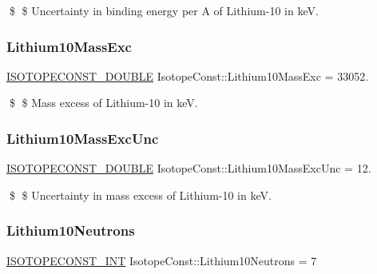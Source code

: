 \$ \$ Uncertainty in binding energy per A of Lithium-\/10 in keV. \mbox{\label{group___isotope_const-_lithium-_li10_ga315401416c2338757900bbe60432f1ac}} 
\subsubsection{\texorpdfstring{Lithium10\+Mass\+Exc}{Lithium10MassExc}}
{\footnotesize\ttfamily \mbox{\hyperlink{group___isotope_const-_macros_ga8f45a7272ce02c0b4c65c44636ed719a}{I\+S\+O\+T\+O\+P\+E\+C\+O\+N\+S\+T\+\_\+\+D\+O\+U\+B\+LE}} Isotope\+Const\+::\+Lithium10\+Mass\+Exc = 33052.}

\$ \$ Mass excess of Lithium-\/10 in keV. \mbox{\label{group___isotope_const-_lithium-_li10_ga5f5e889a13e7f0de11b2d868118b59f3}} 
\subsubsection{\texorpdfstring{Lithium10\+Mass\+Exc\+Unc}{Lithium10MassExcUnc}}
{\footnotesize\ttfamily \mbox{\hyperlink{group___isotope_const-_macros_ga8f45a7272ce02c0b4c65c44636ed719a}{I\+S\+O\+T\+O\+P\+E\+C\+O\+N\+S\+T\+\_\+\+D\+O\+U\+B\+LE}} Isotope\+Const\+::\+Lithium10\+Mass\+Exc\+Unc = 12.}

\$ \$ Uncertainty in mass excess of Lithium-\/10 in keV. \mbox{\label{group___isotope_const-_lithium-_li10_ga46a97c741beed98aa76eb642cfe98f40}} 
\subsubsection{\texorpdfstring{Lithium10\+Neutrons}{Lithium10Neutrons}}
{\footnotesize\ttfamily \mbox{\hyperlink{group___isotope_const-_macros_ga5f18360b3e99483a35c32d789e62621c}{I\+S\+O\+T\+O\+P\+E\+C\+O\+N\+S\+T\+\_\+\+I\+NT}} Isotope\+Const\+::\+Lithium10\+Neutrons = 7}

